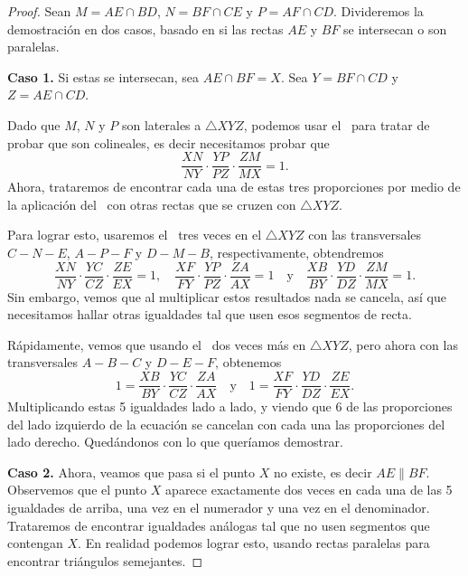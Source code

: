 \begin{proof}
    Sean $M = AE \cap BD$, $N = BF \cap CE$ y $P = AF \cap CD$.
    Divideremos la demostración en dos casos, basado en si las rectas $AE$ y $BF$ se intersecan o son paralelas.

    \textbf{Caso 1.}
    Si estas se intersecan, sea $AE \cap BF = X$.
    Sea $Y = BF \cap CD$ y $Z = AE \cap CD$.

    \begin{figure}[H]
        \centering
        
    \end{figure}

    Dado que $M$, $N$ y $P$ son laterales a $\triangle XYZ$, podemos usar el~ para tratar de probar que son colineales, es decir necesitamos probar que
    \[
        \frac{XN}{NY} \cdot \frac{YP}{PZ} \cdot \frac{ZM}{MX} = 1.
    \]
    Ahora, trataremos de encontrar cada una de estas tres proporciones por medio de la aplicación del~ con otras rectas que se cruzen con $\triangle XYZ$.

    Para lograr esto, usaremos el~ tres veces en el $\triangle XYZ$ con las transversales $C - N - E$, $A - P - F$ y $D - M - B$, respectivamente, obtendremos
    \[
        \frac{XN}{NY} \cdot \frac{YC}{CZ} \cdot \frac{ZE}{EX} = 1, \quad \frac{XF}{FY} \cdot \frac{YP}{PZ} \cdot \frac{ZA}{AX} = 1 \quad \text{y} \quad \frac{XB}{BY} \cdot \frac{YD}{DZ} \cdot \frac{ZM}{MX} = 1.
    \]
    Sin embargo, vemos que al multiplicar estos resultados nada se cancela, así que necesitamos hallar otras igualdades tal que usen esos segmentos de recta.

    Rápidamente, vemos que usando el~ dos veces más en $\triangle XYZ$, pero ahora con las transversales $A - B - C$ y $D - E - F$, obtenemos
    \[
        1 = \frac{XB}{BY} \cdot \frac{YC}{CZ} \cdot \frac{ZA}{AX} \quad \text{y} \quad 1 = \frac{XF}{FY} \cdot \frac{YD}{DZ} \cdot \frac{ZE}{EX}.
    \]
    Multiplicando estas 5 igualdades lado a lado, y viendo que 6 de las proporciones del lado izquierdo de la ecuación se cancelan con cada una las proporciones del lado derecho.
    Quedándonos con lo que queríamos demostrar.

    \textbf{Caso 2.}
    Ahora, veamos que pasa si el punto $X$ no existe, es decir $AE \parallel BF$.
    Observemos que el punto $X$ aparece exactamente dos veces en cada una de las 5 igualdades de arriba, una vez en el numerador y una vez en el denominador.
    Trataremos de encontrar igualdades análogas tal que no usen segmentos que contengan $X$.
    En realidad podemos lograr esto, usando rectas paralelas para encontrar triángulos semejantes.


\end{proof}
